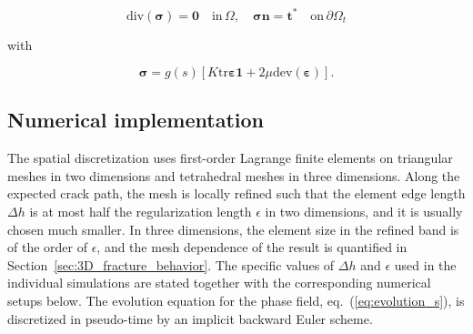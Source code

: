 \documentclass[pdflatex,sn-mathphys-num]{sn-jnl}%
\theoremstyle{thmstyleone}%
\theoremstyle{thmstyletwo}%
\theoremstyle{thmstylethree}%
\begin{document}
\begin{equation}
    \text{div}(\boldsymbol{\sigma}) = \boldsymbol{0} \quad \text{in} \, \Omega, \quad{\boldsymbol{\sigma} \boldsymbol{n} =\boldsymbol{t}^*} \quad\text{on}\,\partial\Omega_t
    \label{eq:equilibrium_elastic}
\end{equation}

with 

\begin{equation}
    \boldsymbol{\sigma} = g(s)\left[K \text{tr}\boldsymbol{\varepsilon}\boldsymbol{1} + 2\mu\text{dev}(\boldsymbol{\varepsilon})\right].
\end{equation}



\subsection{Numerical implementation}
\label{sec:numerical_implementation}

The spatial discretization uses first-order Lagrange finite elements on triangular meshes in two dimensions and tetrahedral meshes in three dimensions. Along the expected crack path, the mesh is locally refined such that the element edge length $\Delta h$ is at most half the regularization length $\epsilon$ in two dimensions, and it is usually chosen much smaller. In three dimensions, the element size in the refined band is of the order of $\epsilon$, and the mesh dependence of the result is quantified in Section~\ref{sec:3D_fracture_behavior}. The specific values of $\Delta h$ and $\epsilon$ used in the individual simulations are stated together with the corresponding numerical setups below. The evolution equation for the phase field, eq.~(\ref{eq:evolution_s}), is discretized in pseudo-time by an implicit backward Euler scheme.
\end{document}
